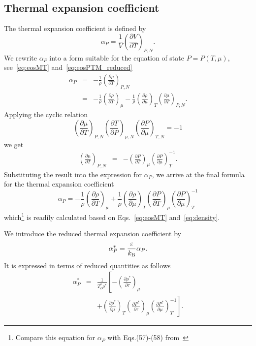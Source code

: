 \subsection{Thermal expansion coefficient}
The thermal expansion coefficient is defined by
\begin{equation}
	\alpha_P = \frac{1}{V}\left(\frac{\partial V}{\partial T}\right)_{P,N}.
\end{equation}
We rewrite $\alpha_P$ into a form suitable for the equation of state $P=P(T,\mu)$, see~\eqref{eq:eosMT} and~\eqref{eq:eosPTM_reduced}
\begin{eqnarray}
	\label{eq:alpha_vs_rho}
	\alpha_P & = & -\frac{1}{\rho} \left(\frac{\partial \rho}{\partial T}\right)_{P, N}
	\\
	& = & -\frac{1}{\rho} \left(\frac{\partial \rho}{\partial T}\right)_{\mu} 
	- \frac{1}{\rho} \left(\frac{\partial \rho}{\partial \mu}\right)_{T}
	\left(\frac{\partial \mu}{\partial T}\right)_{P, N}.
\end{eqnarray}
Applying the cyclic relation
\begin{equation*}
	\left(\frac{\partial \mu}{\partial T}\right)_{P, N}
	\left(\frac{\partial T}{\partial P}\right)_{\mu, N}
	\left(\frac{\partial P}{\partial \mu}\right)_{T, N}
	= -1
\end{equation*}
we get
\begin{eqnarray*}
	\left(\frac{\partial \mu}{\partial T}\right)_{P, N} & = & 
	- \left(\frac{\partial P}{\partial T}\right)_{\mu}
	\left(\frac{\partial P}{\partial \mu}\right)^{-1}_{T}.
\end{eqnarray*}
Substituting the result into the expression for $\alpha_P$, we arrive at the final formula for the thermal expansion coefficient
\begin{equation}
	\label{eq:alphaP1}
	\alpha_P = -\frac{1}{\rho}\left(\frac{\partial \rho}{\partial T}\right)_{\mu}
	+ \frac{1}{\rho} \left(\frac{\partial \rho}{\partial \mu}\right)_{T}
	\left(\frac{\partial P}{\partial T}\right)_{\mu}
	\left(\frac{\partial P}{\partial \mu}\right)^{-1}_{T}
\end{equation}
which\footnote{Compare this equation for $\alpha_P$ with Eqs.(57)-(58) from~\cite{StrokerMeier2021}} is readily calculated based on Eqs.~\eqref{eq:eosMT} and~\eqref{eq:density}.

We introduce the reduced thermal expansion coefficient by
\begin{equation}
	\alpha^*_P = \frac{\varepsilon}{k_{\rm B}} \alpha_P.
\end{equation}
It is expressed in terms of reduced quantities as follows
\begin{eqnarray}
	\alpha^*_P & = & \frac{1}{T^*_c \rho^*}
	\left[ 
	-\left(\frac{\partial \rho^*}{\partial \tau}\right)_{\mu}
	\right. \nonumber\\
	&& + \left.\left(\frac{\partial \rho^*}{\partial \mu}\right)_{T}
	\left(\frac{\partial P^*}{\partial \tau}\right)_{\mu}
	\left(\frac{\partial P^*}{\partial \mu}\right)^{-1}_{T} 
	\right].
\end{eqnarray}

